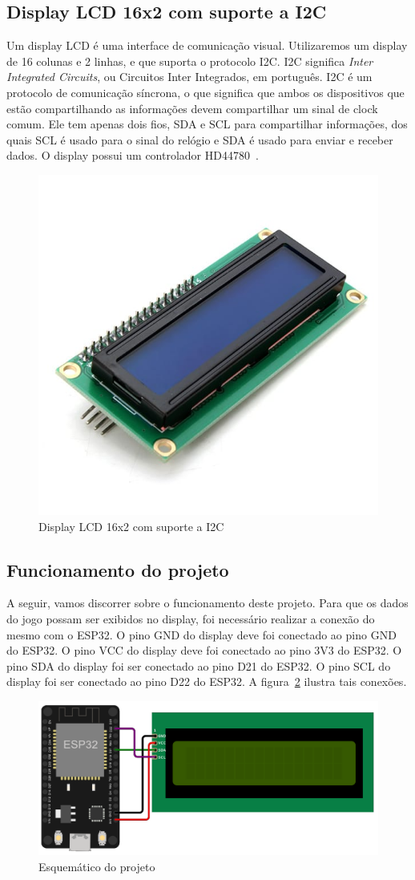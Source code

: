 \documentclass[12pt]{article}
\begin{document}
\subsection{Display LCD 16x2 com suporte a I2C}

Um display LCD é uma interface de comunicação visual. Utilizaremos um display de 16 colunas e 2 linhas,
e que suporta o protocolo I2C. I2C significa \emph{Inter Integrated Circuits}, ou Circuitos Inter Integrados, em português.
I2C é um protocolo de comunicação síncrona, o que significa que ambos os dispositivos que estão compartilhando as informações
devem compartilhar um sinal de clock comum. Ele tem apenas dois fios, SDA e SCL para compartilhar informações, dos quais SCL é
usado para o sinal do relógio e SDA é usado para enviar e receber dados.
O display possui um controlador HD44780~\cite{display}.

\begin{figure}[ht]
  \centering
  \includegraphics[width=.3\textwidth]{images/display.jpg}
  \caption{Display LCD 16x2 com suporte a I2C}
  \label{fig:display}
\end{figure}

\subsection{Funcionamento do projeto}

A seguir, vamos discorrer sobre o funcionamento deste projeto. Para que os dados do jogo possam ser exibidos no display,
foi necessário realizar a conexão do mesmo com o ESP32. O pino GND do display deve foi conectado ao pino GND do ESP32.
O pino VCC do display deve foi conectado ao pino 3V3 do ESP32. O pino SDA do display foi ser conectado ao pino
D21 do ESP32. O pino SCL do display foi ser conectado ao pino D22 do ESP32.
A figura~\ref{fig:schematic} ilustra tais conexões.

\begin{figure}[ht]
  \centering
  \includegraphics[width=.7\textwidth]{images/schematic.png}
  \caption{Esquemático do projeto}
  \label{fig:schematic}
\end{figure}
\end{document}
